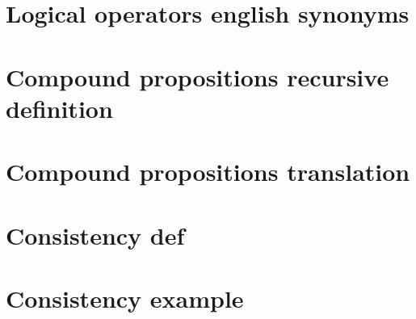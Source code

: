 \section*{Logical operators english synonyms}

\vfill
\section*{Compound propositions recursive definition}

\vfill
\section*{Compound propositions translation}

\vfill
\section*{Consistency def}

\vfill
\section*{Consistency example}

\vfill
